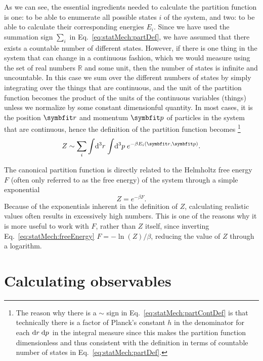 As we can see, the essential ingredients needed to calculate the partition function is one: to be able to
enumerate all possible states $i$ of the system, and two: to be able to calculate their corresponding energies $E_i$.
Since we have used the summation sign $\sum_i$ in Eq.~\eqref{eq:statMech:partDef}, we have 
assumed that there exists a countable number of different states. However, if there is one thing in the
system that can change in a continuous fashion, which we would measure using the set of real numbers
$\mathbb{R}$ and some unit, then the number of states is infinite and uncountable. In this case we sum over the
different numbers of states by simply integrating over the things that are continuous, and the unit
of the partition function becomes the product of the units of the continuous variables (things) unless
we normalize by some constant dimensionful quantity.
In most cases, it is the position $\v{r}$ and momentum $\v{p}$ of particles in the system that are continuous, hence
the definition of the partition function becomes%
\footnote{The reason why there is a $\sim$ sign in Eq.~\eqref{eq:statMech:partContDef} is that technically there is a factor
of Planck's constant $h$ in the denominator for each $\mathop{\textrm{d}\kern0emr\kern0.1em}\mathop{\textrm{d}\kern0emp\kern0.1em}$ in the integral measure since this makes the partition function
dimensionless and thus consistent with the definition in terms of countable number of states in Eq.~\eqref{eq:statMech:partDef}.}
\begin{equation}
    Z \sim \sum_i\sint\d{^3r}\sint\d{^3p} e^{-\beta E_i(\v{r},\v{p})}.
    \label{eq:statMech:partContDef}
\end{equation}

The canonical partition function is directly related to the Helmholtz free energy $F$ (often only referred to
as the free energy) of the system through a simple exponential
\begin{equation}
    \label{eq:statMech:freeEnergy}
    Z = e^{-\beta F}.
\end{equation}
Because of the exponentials inherent in the definition of $Z$, calculating realistic values often results
in excessively high numbers. This is one of the reasons why it is more useful to work with $F$, rather than $Z$ itself,
since inverting Eq.~\eqref{eq:statMech:freeEnergy} $F = -\ln(Z)/\beta$, reducing the value of $Z$ through
a logarithm.

\section{Calculating observables}

